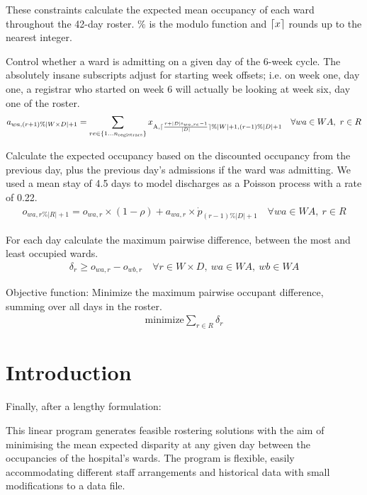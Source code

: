\documentclass[a4paper]{article}
\DeclarePairedDelimiter{\ceil}{\lceil}{\rceil}
\begin{document}
These constraints calculate the expected mean occupancy of each ward throughout the 42-day roster. $\%$ is the modulo function and $\ceil{x}$ rounds up to the nearest integer.

Control whether a ward is admitting on a given day of the 6-week cycle. The absolutely insane subscripts adjust for starting week offsets; i.e. on week one, day one, a registrar who started on week 6 will actually be looking at week six, day one of the roster.
\begin{align}
  a_{wa, (r+1)\%|W\times D|+1} = \sum_{re\in \{1\dots n_\text{registrars}\}}{x_{\text{A}, \ceil{\frac{r+|D|\text{s}_{wa, re}-1}{|D|}} \% |W|+1, (r-1) \% |D|+1}} \quad\forall wa \in WA,\ r \in R
\end{align}

Calculate the expected occupancy based on the discounted occupancy from the previous day, plus the previous day's admissions if the ward was admitting. We used a mean stay of 4.5 days to model discharges as a Poisson process with a rate of 0.22.
\begin{align}
  o_{wa, r\%|R|+1} = o_{wa, r} \times (1-\rho) + a_{wa, r} \times \dot{p}_{(r-1)\%|D|+1} \quad\forall wa \in WA,\ r \in R
\end{align}

For each day calculate the maximum pairwise difference, between the most and least occupied wards.
\begin{align}
  \delta_r \ge o_{wa, r} - o_{wb, r} \quad\forall r \in W\times D,\ wa \in WA,\ wb \in WA
\end{align}

\begin{framed}
Objective function: Minimize the maximum pairwise occupant difference, summing over all days in the roster.
\begin{align}
  \text{minimize} \sum_{r\in R}{\delta_r}
\end{align}
\end{framed}

\section{Introduction}

Finally, after a lengthy formulation:

This linear program generates feasible rostering solutions with the aim of minimising the mean expected disparity at any given day between the occupancies of the hospital's wards. The program is flexible, easily accommodating different staff arrangements and historical data with small modifications to a data file.
\end{document}
